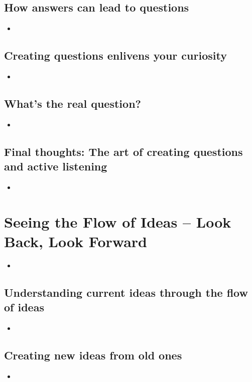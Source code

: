 \documentclass[11pt]{article}
\begin{document}
\subsection{How answers can lead to questions}
\begin{itemize}
\item
\end{itemize}

\subsection{Creating questions enlivens your curiosity}
\begin{itemize}
\item
\end{itemize}

\subsection{What's the real question?}
\begin{itemize}
\item
\end{itemize}

\subsection{Final thoughts: The art of creating questions and active listening}
\begin{itemize}
\item
\end{itemize}

\section{Seeing the Flow of Ideas -- Look Back, Look Forward}
\begin{itemize}
\item
\end{itemize}

\subsection{Understanding current ideas through the flow of ideas}
\begin{itemize}
\item
\end{itemize}

\subsection{Creating new ideas from old ones}
\begin{itemize}
\item
\end{itemize}
\end{document}
